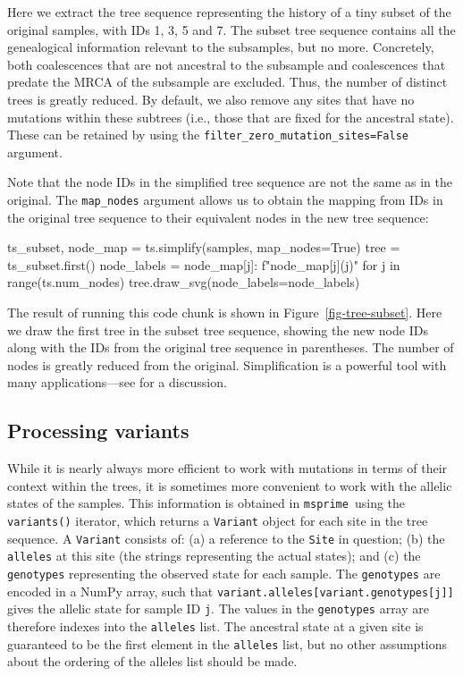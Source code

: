 \documentclass[graybox]{svmult}
\newcommand{\msprime}[0]{\texttt{msprime}}
\begin{document}
Here we extract the tree sequence representing the history of a tiny
subset of the original samples, with IDs 1, 3, 5 and 7. The subset tree
sequence contains all the genealogical information relevant to the
subsamples, but no more. Concretely, both coalescences that are not ancestral to the
subsample and coalescences that predate
the MRCA of the subsample are excluded. Thus, the number of distinct trees is greatly
reduced. By default, we also remove any sites that have no mutations
within these subtrees (i.e., those that are fixed for the ancestral
state). These can be retained by using the
\texttt{filter\_zero\_mutation\_sites=False} argument.

Note that the node IDs in the simplified tree sequence are not the same as in the
original. The \texttt{map\_nodes} argument allows us to obtain the
mapping from IDs in the original tree sequence to their equivalent nodes
in the new tree sequence:

\begin{pythoncode}
ts_subset, node_map = ts.simplify(samples, map_nodes=True)
tree = ts_subset.first()
node_labels = {
    node_map[j]: f"{node_map[j]}({j})"
    for j in range(ts.num_nodes)}
tree.draw_svg(node_labels=node_labels)
\end{pythoncode}



The result of running this code chunk is shown in Figure~\ref{fig-tree-subset}.
Here we draw the first tree in the subset tree sequence, showing the new
node IDs along with the IDs from the original tree sequence in
parentheses. The number of nodes is greatly reduced from the original.
Simplification is a powerful tool with many applications---see
\cite{wong2024general} for a discussion.

\subsection{Processing variants}\label{processing-variants}

While it is nearly always more efficient to work with mutations in terms
of their context within the trees, it is sometimes more convenient to
work with the allelic states of the samples. This information is
obtained in \msprime\ using the \texttt{variants()} iterator, which
returns a \texttt{Variant} object for each site in the tree sequence. A
\texttt{Variant} consists of: (a) a reference to the \texttt{Site} in question;
(b) the \texttt{alleles} at this site (the strings representing the
actual states); and (c) the \texttt{genotypes} representing the observed
state for each sample. The \texttt{genotypes} are encoded in a NumPy
array, such that
\texttt{variant.alleles[variant.genotypes[j]]}
gives the allelic state for sample ID \texttt{j}. The values in the
\texttt{genotypes} array are therefore indexes into the \texttt{alleles}
list. The ancestral state at a given site is guaranteed to be the first
element in the \texttt{alleles} list, but no other assumptions about
the ordering of the alleles list should be made.
\end{document}
